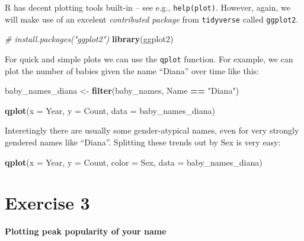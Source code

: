 \documentclass[]{book}
\newenvironment{Shaded}{\begin{snugshade}}{\end{snugshade}}
\newcommand{\KeywordTok}[1]{\textcolor[rgb]{0.13,0.29,0.53}{\textbf{#1}}}
\newcommand{\DataTypeTok}[1]{\textcolor[rgb]{0.13,0.29,0.53}{#1}}
\newcommand{\StringTok}[1]{\textcolor[rgb]{0.31,0.60,0.02}{#1}}
\newcommand{\CommentTok}[1]{\textcolor[rgb]{0.56,0.35,0.01}{\textit{#1}}}
\newcommand{\OperatorTok}[1]{\textcolor[rgb]{0.81,0.36,0.00}{\textbf{#1}}}
\newcommand{\NormalTok}[1]{#1}
\begin{document}
R has decent plotting tools built-in -- see e.g., \texttt{help(plot)}.
However, again, we will make use of an excelent \emph{contributed
package} from \texttt{tidyverse} called \texttt{ggplot2}.

\begin{Shaded}
\begin{Highlighting}[]
\CommentTok{# install.packages("ggplot2")}
\KeywordTok{library}\NormalTok{(ggplot2)}
\end{Highlighting}
\end{Shaded}

For quick and simple plots we can use the \texttt{qplot} function. For
example, we can plot the number of babies given the name ``Diana'' over
time like this:

\begin{Shaded}
\begin{Highlighting}[]
\NormalTok{baby_names_diana <-}\StringTok{ }\KeywordTok{filter}\NormalTok{(baby_names, Name }\OperatorTok{==}\StringTok{ "Diana"}\NormalTok{)}
\end{Highlighting}
\end{Shaded}

\begin{Shaded}
\begin{Highlighting}[]
\KeywordTok{qplot}\NormalTok{(}\DataTypeTok{x =}\NormalTok{ Year, }\DataTypeTok{y =}\NormalTok{ Count,}
     \DataTypeTok{data =}\NormalTok{ baby_names_diana)}
\end{Highlighting}
\end{Shaded}

Interetingly there are usually some gender-atypical names, even for very
strongly gendered names like ``Diana''. Splitting these trends out by
Sex is very easy:

\begin{Shaded}
\begin{Highlighting}[]
\KeywordTok{qplot}\NormalTok{(}\DataTypeTok{x =}\NormalTok{ Year, }\DataTypeTok{y =}\NormalTok{ Count, }\DataTypeTok{color =}\NormalTok{ Sex,}
      \DataTypeTok{data =}\NormalTok{ baby_names_diana)}
\end{Highlighting}
\end{Shaded}

\section{Exercise 3}\label{exercise-3}

\textbf{Plotting peak popularity of your name}
\end{document}
